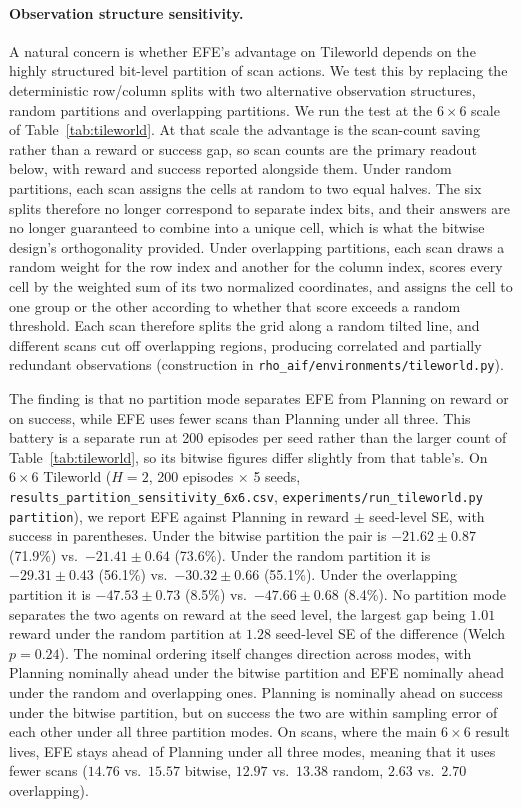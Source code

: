 \paragraph{Observation structure sensitivity.} A natural concern is whether EFE's advantage on Tileworld depends on the highly structured bit-level partition of scan actions. We test this by replacing the deterministic row/column splits with two alternative observation structures, random partitions and overlapping partitions. We run the test at the $6{\times}6$ scale of Table~\ref{tab:tileworld}. At that scale the advantage is the scan-count saving rather than a reward or success gap, so scan counts are the primary readout below, with reward and success reported alongside them. Under random partitions, each scan assigns the cells at random to two equal halves. The six splits therefore no longer correspond to separate index bits, and their answers are no longer guaranteed to combine into a unique cell, which is what the bitwise design's orthogonality provided. Under overlapping partitions, each scan draws a random weight for the row index and another for the column index, scores every cell by the weighted sum of its two normalized coordinates, and assigns the cell to one group or the other according to whether that score exceeds a random threshold. Each scan therefore splits the grid along a random tilted line, and different scans cut off overlapping regions, producing correlated and partially redundant observations (construction in \texttt{rho\_\allowbreak aif/\allowbreak environments/\allowbreak tileworld.py}).

The finding is that no partition mode separates EFE from Planning on reward or on success, while EFE uses fewer scans than Planning under all three. This battery is a separate run at 200 episodes per seed rather than the larger count of Table~\ref{tab:tileworld}, so its bitwise figures differ slightly from that table's. On $6{\times}6$ Tileworld ($H{=}2$, 200 episodes $\times$ 5 seeds, \texttt{results\_\allowbreak partition\_\allowbreak sensitivity\_\allowbreak 6x6.csv}, \texttt{experiments/\allowbreak run\_\allowbreak tileworld.py partition}), we report EFE against Planning in reward $\pm$ seed-level SE, with success in parentheses. Under the bitwise partition the pair is $-21.62 \pm 0.87$ (71.9\%) vs.\ $-21.41 \pm 0.64$ (73.6\%). Under the random partition it is $-29.31 \pm 0.43$ (56.1\%) vs.\ $-30.32 \pm 0.66$ (55.1\%). Under the overlapping partition it is $-47.53 \pm 0.73$ (8.5\%) vs.\ $-47.66 \pm 0.68$ (8.4\%). No partition mode separates the two agents on reward at the seed level, the largest gap being $1.01$ reward under the random partition at $1.28$ seed-level SE of the difference (Welch $p{=}0.24$). The nominal ordering itself changes direction across modes, with Planning nominally ahead under the bitwise partition and EFE nominally ahead under the random and overlapping ones. Planning is nominally ahead on success under the bitwise partition, but on success the two are within sampling error of each other under all three partition modes. On scans, where the main $6{\times}6$ result lives, EFE stays ahead of Planning under all three modes, meaning that it uses fewer scans ($14.76$ vs.\ $15.57$ bitwise, $12.97$ vs.\ $13.38$ random, $2.63$ vs.\ $2.70$ overlapping).


